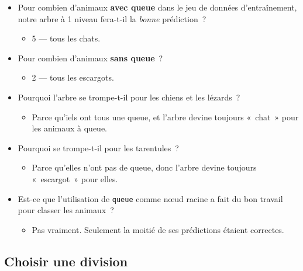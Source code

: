 \documentclass[12pt,a4paper]{article}
\begin{document}
\begin{thinkbox}
  \begin{itemize}
    \item Pour combien d'animaux \textbf{avec queue} dans le jeu de données d'entraînement, notre arbre à 1 niveau fera-t-il la \emph{bonne} prédiction~?
    \begin{itemize}
      \item 5 — tous les chats.
    \end{itemize}
    \item Pour combien d'animaux \textbf{sans queue}~?
    \begin{itemize}
      \item 2 — tous les escargots.
    \end{itemize}
    \item Pourquoi l'arbre se trompe-t-il pour les chiens et les lézards~?
    \begin{itemize}
      \item Parce qu'iels ont tous une queue, et l'arbre devine toujours «~chat~» pour les animaux à queue.
    \end{itemize}
    \item Pourquoi se trompe-t-il pour les tarentules~?
    \begin{itemize}
      \item Parce qu'elles n'ont pas de queue, donc l'arbre devine toujours «~escargot~» pour elles.
    \end{itemize}
    \item Est-ce que l'utilisation de \texttt{queue} comme nœud racine a fait du bon travail pour classer les animaux~?
    \begin{itemize}
      \item Pas vraiment. Seulement la moitié de ses prédictions étaient correctes.
    \end{itemize}
  \end{itemize}
\end{thinkbox}

\subsection{Choisir une division}
\end{document}
